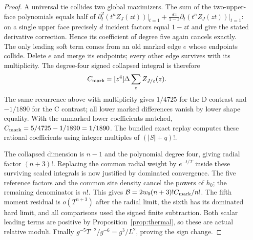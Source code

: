 \begin{proof}
A universal tie collides two global maximizers. The sum of the two-upper-face polynomials equals half of
\(\partial_t^2(t^n Z_J(zt))\big|_{t=1}
+\frac{dz}{1-z}\partial_t(t^n Z_J(zt))\big|_{t=1}\):
on a single upper face precisely \(d\) incident factors equal \(1-zt\) and give the stated derivative correction. Hence its coefficient of degree five again cancels exactly. The only leading soft term comes from an old marked edge \(e\) whose endpoints collide. Delete \(e\) and merge its endpoints; every other edge survives with its multiplicity. The degree-four signed collapsed integral is therefore
\[
 C_{\rm mark}=[z^4]\Delta\sum_e Z_{J/e}(z).
\]
The same recurrence above with multiplicity gives \(1/4725\) for the D contrast and \(-1/1890\) for the C contrast; all lower marked differences vanish by lower shape equality. With the unmarked lower coefficients matched, \(C_{\rm mark}=5/4725-1/1890=1/1890\). The bundled exact replay computes these rational coefficients using integer multiples of \((|S|+q)!\).

The collapsed dimension is \(n-1\) and the polynomial degree four, giving radial factor \((n+3)!\). Replacing the common radial weight by \(e^{-t/T}\) inside these surviving scaled integrals is now justified by dominated convergence. The five reference factors and the common site density cancel the powers of \(h_0\); the remaining denominator is \(n!\). This gives \(\mathcal B=2w_0(n+3)!C_{\rm mark}/n!\). The fifth moment residual is \(o(T^{n+3})\) after the radial limit, the sixth has its dominated hard limit, and all comparisons used the signed finite subtraction. Both scalar leading terms are positive by Proposition~\ref{prop:thermal}, so these are actual relative moduli. Finally \(g^{-5}T^{-2}/g^{-6}=g^3/L^2\), proving the sign change.
\end{proof}
